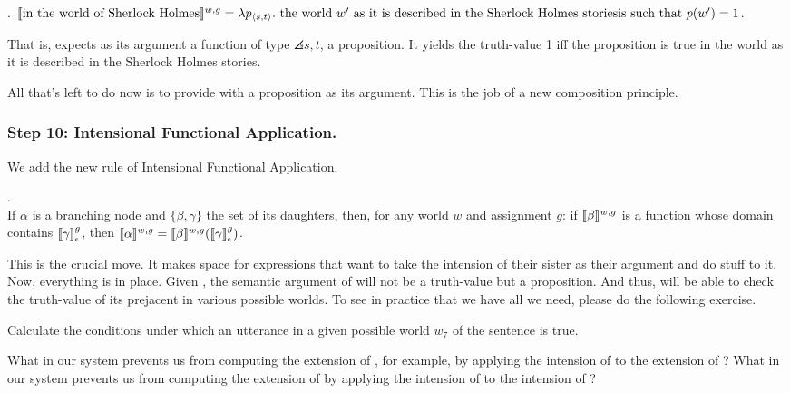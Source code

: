 \ex. $\llbracket \mbox{in the world of Sherlock Holmes} \rrbracket^{w,g} =\\
\lambda p_{\langle s,t \rangle}.\ \mbox{the world } w' \mbox{ as it is described in the Sherlock Holmes stories}\\
\mbox{is such that } p(w') = 1$.

That is,  expects as its argument a
function of type $\angles{s,t}$, a proposition. It yields the truth-value 1 iff
the proposition is true in the world as it is described in the Sherlock Holmes
stories.

All that's left to do now is to provide  with a proposition as its argument. This is the job of a new
composition principle.

\subsubsection{Step 10: Intensional Functional Application.} \label{sec:intens-funct-appl}

We add the new rule of Intensional Functional Application.

\ex. \\
If $\alpha$ is a branching node and $\{\beta, \gamma\}$ the set of its
daughters, then, for any world $w$ and assignment $g$: if $\llbracket \beta \rrbracket^{w,g}$ is
a function whose domain contains $\svcent{\gamma}^g$, then $\sv{\alpha}^{w,g} =
\sv{\beta}^{w,g} (\svcent{\gamma}^g)$.

This is the crucial move. It makes space for expressions that want to take the
intension of their sister as their argument and do stuff to it. Now, everything
is in place. Given \LLast, the semantic argument of  will not be a truth-value but a proposition. And thus,
 will be able to check the
truth-value of its prejacent in various possible worlds. To see in practice that
we have all we need, please do the following exercise.

\begin{exercise}
  Calculate the conditions under which an utterance in a given possible world
  $w_7$ of the sentence  is true. \eex
\end{exercise}

\begin{exercise}
  What in our system prevents us from computing the extension of
  , for example, by applying the intension of
   to the extension of ? What in our system
  prevents us from computing the extension of  by
  applying the intension of  to the intension of
  ? \eex
\end{exercise}

